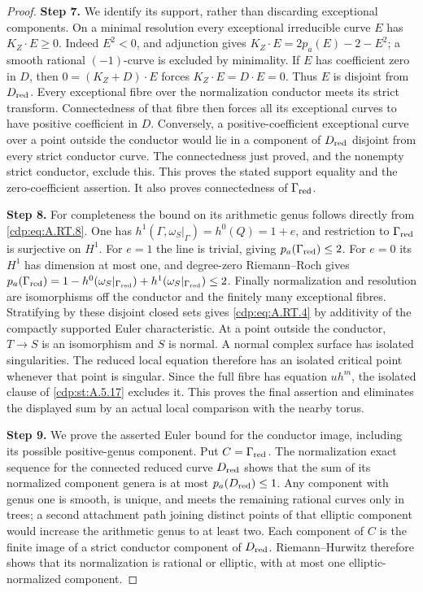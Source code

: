 \begin{proof}
\noindent\textbf{Step 7.} We identify its support, rather than discarding exceptional
components. On a minimal resolution every exceptional
irreducible curve $E$ has $K_Z\cdot E\ge0$. Indeed
$E^2<0$, and adjunction gives
$K_Z\cdot E=2p_a(E)-2-E^2$; a smooth rational
$(-1)$-curve is excluded by minimality. If $E$ has coefficient
zero in $D$, then
$0=(K_Z+D)\cdot E$ forces $K_Z\cdot E=D\cdot E=0$.
Thus $E$ is disjoint from $D_{\rm red}$.
Every exceptional fibre over the normalization conductor meets
its strict transform. Connectedness of that fibre then forces
all its exceptional curves to have positive coefficient in $D$.
Conversely, a positive-coefficient exceptional curve over a point
outside the conductor would lie in a component of $D_{\rm red}$
disjoint from every strict conductor curve. The connectedness
just proved, and the nonempty strict conductor, exclude this.
This proves the stated support equality and the zero-coefficient
assertion. It also proves connectedness of $\Gamma_{\rm red}$.

\noindent\textbf{Step 8.} For completeness the bound on its arithmetic genus follows
directly from \eqref{cdp:eq:A.RT.8}. One has
$h^1(\Gamma,\omega_S|_\Gamma)=h^0(Q)=1+e$,
and restriction to $\Gamma_{\rm red}$ is surjective on $H^1$.
For $e=1$ the line is trivial, giving
$p_a(\Gamma_{\rm red})\le2$. For $e=0$ its $H^1$ has
dimension at most one, and degree-zero Riemann--Roch gives
$p_a(\Gamma_{\rm red})=1-h^0(\omega_S|_{\Gamma_{\rm red}})
+h^1(\omega_S|_{\Gamma_{\rm red}})\le2$.
Finally normalization and resolution are isomorphisms off the
conductor and the finitely many exceptional fibres.
Stratifying by these disjoint closed sets gives \eqref{cdp:eq:A.RT.4} by
additivity of the compactly supported Euler characteristic.
At a point outside the conductor, $T\to S$ is an
isomorphism and $S$ is normal. A normal complex surface
has isolated singularities. The reduced local equation
therefore has an isolated critical point whenever that
point is singular. Since the full fibre has equation
$u h^m$, the isolated clause of \ref{cdp:st:A.5.17} excludes it.
This proves the final assertion and eliminates the displayed
sum by an actual local comparison with the nearby torus.

\noindent\textbf{Step 9.} We prove the asserted Euler bound for the conductor image,
including its possible positive-genus component. Put
$C=\Gamma_{\rm red}$. The normalization exact sequence for
the connected reduced curve $D_{\rm red}$ shows that the sum
of its normalized component genera is at most
$p_a(D_{\rm red})\le1$. Any component with genus one is
smooth, is unique, and meets the remaining rational curves
only in trees; a second attachment path joining distinct
points of that elliptic component would increase the
arithmetic genus to at least two. Each component of $C$ is
the finite image of a strict conductor component of
$D_{\rm red}$. Riemann--Hurwitz therefore shows that its
normalization is rational or elliptic, with at most one
elliptic-normalized component.


\end{proof}
